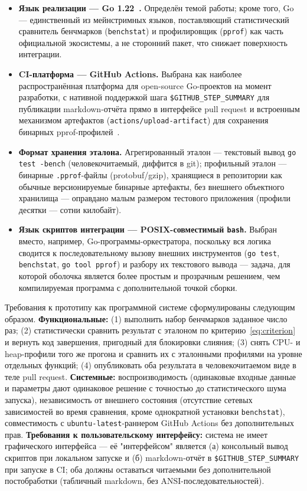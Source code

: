 \begin{itemize}
\item \textbf{Язык реализации — Go 1.22~\cite{go-release-notes}.} Определён
темой работы; кроме того, Go — единственный из мейнстримных языков, поставляющий
статистический сравнитель бенчмарков (\texttt{benchstat}) и профилировщик
(\texttt{pprof}) как часть официальной экосистемы, а не сторонний пакет,
что снижает поверхность интеграции.
\item \textbf{CI-платформа — GitHub Actions.} Выбрана как наиболее
распространённая платформа для open-source Go-проектов на момент
разработки, с нативной поддержкой шага \texttt{\$GITHUB\_STEP\_SUMMARY} для
публикации markdown-отчёта прямо в интерфейсе pull request и встроенным
механизмом артефактов (\texttt{actions/\allowbreak upload-artifact}) для сохранения
бинарных pprof-профилей~\cite{gh-actions-doc}.
\item \textbf{Формат хранения эталона.} Агрегированный эталон —
текстовый вывод \texttt{go test -bench} (человекочитаемый, диффится в git);
профильный эталон — бинарные \texttt{.pprof}-файлы (protobuf/gzip),
хранящиеся в репозитории как обычные версионируемые бинарные артефакты, без
внешнего объектного хранилища — оправдано малым размером тестового
приложения (профили десятки — сотни килобайт).
\item \textbf{Язык скриптов интеграции — POSIX-совместимый \texttt{bash}.}
Выбран вместо, например, Go-программы-оркестратора, поскольку вся логика
сводится к последовательному вызову внешних инструментов (\texttt{go
test}, \texttt{benchstat}, \texttt{go tool pprof}) и разбору их текстового
вывода — задача, для которой оболочка является более простым и прозрачным
решением, чем компилируемая программа с дополнительной точкой сборки.
\end{itemize}

Требования к прототипу как программной системе сформулированы следующим
образом. \textbf{Функциональные:} (1) выполнить набор бенчмарков заданное
число раз; (2) статистически сравнить результат с эталоном по
критерию~\eqref{eq:criterion} и вернуть код завершения, пригодный для
блокировки слияния; (3) снять CPU- и heap-профили того же прогона и
сравнить их с эталонными профилями на уровне отдельных функций;
(4) опубликовать оба результата в человекочитаемом виде в теле pull
request. \textbf{Системные:} воспроизводимость (одинаковые входные данные
и параметры дают одинаковое решение с точностью до статистического шума
запуска), независимость от внешнего состояния (отсутствие сетевых
зависимостей во время сравнения, кроме однократной установки
\texttt{benchstat}), совместимость с \texttt{ubuntu-latest}-раннером
GitHub Actions без дополнительных прав. \textbf{Требования к
пользовательскому интерфейсу:} система не имеет графического интерфейса —
её "интерфейсом" является (а) консольный вывод скриптов при локальном
запуске и (б) markdown-отчёт в \texttt{\$GITHUB\_STEP\_SUMMARY} при запуске
в CI; оба должны оставаться читаемыми без дополнительной постобработки
(табличный markdown, без ANSI-последовательностей).

